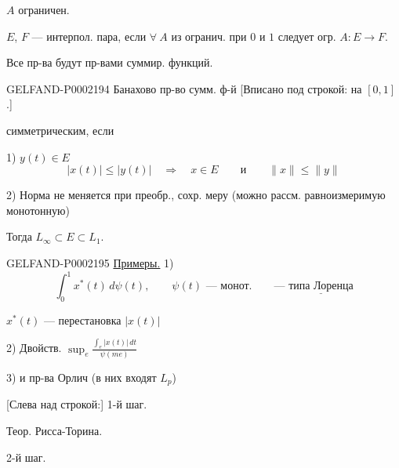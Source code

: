 $A$ ограничен.

$E$, $F$ — интерпол. пара, если $\forall\ A$ из огранич.
при $0$ и $1$ следует огр. $A:E\longrightarrow F$.



Все пр-ва будут пр-вами суммир. функций.



\begin{GelfandAdjacentEvidence}{GELFAND-P000219}{4}
Банахово пр-во сумм. ф-й [Вписано под строкой: на $[0,1]$.]
\end{GelfandAdjacentEvidence}
 симметрическим, если

1) $y(t)\in E$
\begin{equation*}
 |x(t)|\leq |y(t)|\quad\Longrightarrow\quad x\in E
 \qquad\text{и}\qquad \|x\|\leq\|y\|
\end{equation*}



2) Норма не меняется при преобр., сохр. меру
(можно рассм. равноизмеримую монотонную)



Тогда $L_\infty\subset E\subset L_1$.



\begin{GelfandAdjacentEvidence}{GELFAND-P000219}{5}
\underline{Примеры.} 1)
\begin{equation*}
 \int_0^1 x^*(t)\,d\psi(t),\qquad \psi(t)\text{ — монот.}
 \qquad\text{— }\underline{\text{типа Лоренца}}
\end{equation*}
\end{GelfandAdjacentEvidence}

$x^*(t)$ — перестановка $|x(t)|$



2) Двойств.\quad
$\displaystyle\sup_e\frac{\int_e|x(t)|\,dt}{\psi(me)}$



3) и пр-ва Орлич (в них входят $L_p$)



[Слева над строкой:] 1-й шаг.

Теор. Рисса-Торина.





2-й шаг.

